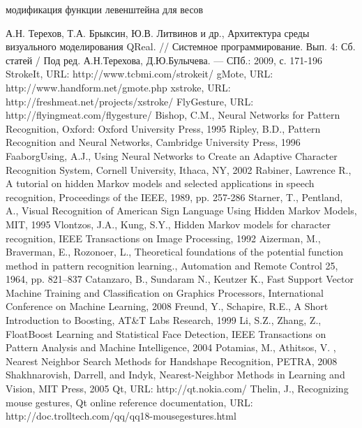 \documentclass[a5paper]{article}
\begin{document}
модификация функции левенштейна для весов

\pagebreak

\begin{thebibliography}{99}
   А.Н. Терехов, Т.А. Брыксин, Ю.В. Литвинов и др., Архитектура среды визуального моделирования QReal. // Системное 
программирование. Вып. 4: Сб. статей / Под ред. А.Н.Терехова, Д.Ю.Булычева. --- СПб.: 2009, с. 171-196
   StrokeIt, URL: http://www.tcbmi.com/strokeit/  
   gMote, URL: http://www.handform.net/gmote.php
   xstroke, URL: http://freshmeat.net/projects/xstroke/
   FlyGesture, URL: http://flyingmeat.com/flygesture/
   Bishop, C.M., Neural Networks for Pattern Recognition, Oxford: Oxford University Press, 1995
   Ripley, B.D., Pattern Recognition and Neural Networks, Cambridge University Press, 1996
   FaaborgUsing, A.J., Using Neural Networks to Create an Adaptive Character Recognition System, Cornell University, Ithaca, NY, 2002
   Rabiner, Lawrence R., A tutorial on hidden Markov models and selected applications in speech recognition, Proceedings of the IEEE, 1989, pp. 257-286
   Starner, T., Pentland, A., Visual Recognition of American Sign Language Using Hidden Markov Models, MIT, 1995
   Vlontzos, J.A., Kung, S.Y., Hidden Markov models for character recognition, IEEE Transactions on Image Processing, 1992
   Aizerman, M., Braverman, E., Rozonoer, L., Theoretical foundations of the potential function method in pattern recognition learning., 
Automation and Remote Control 25, 1964, pp. 821–837
   Catanzaro, B., Sundaram N., Keutzer K., Fast Support Vector Machine Training and Classification on Graphics Processors, International 
Conference on Machine Learning, 2008
   Freund, Y., Schapire, R.E., A Short Introduction to Boosting, AT\&T Labs Research, 1999
   Li, S.Z., Zhang, Z., FloatBoost Learning and Statistical Face Detection, IEEE Transactions on Pattern Analysis and Machine Intelligence, 2004
   Potamias, M., Athitsos, V. , Nearest Neighbor Search Methods for Handshape Recognition, PETRA, 2008
   Shakhnarovish, Darrell, and Indyk, Nearest-Neighbor Methods in Learning and Vision, MIT Press, 2005
   Qt, URL: http://qt.nokia.com/
   Thelin, J., Recognizing mouse gestures, Qt online reference documentation, URL: http://doc.trolltech.com/qq/qq18-mousegestures.html 
\end{thebibliography}
  
\end{document}
